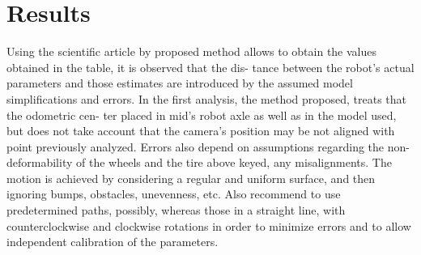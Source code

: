 \section{Results}
Using the scientific article by proposed method allows to obtain the values obtained in the table, it is observed that the dis- tance between the robot’s actual parameters and those estimates are introduced by the assumed model simplifications and errors.
In the first analysis, the method proposed, treats that the odometric cen- ter placed in mid’s robot axle as well as in the model used, but does not take account that the camera’s position may be not aligned with point previously analyzed. 
Errors also depend on assumptions regarding the non-deformability of the wheels and the tire above keyed, any misalignments. The motion is achieved by considering a regular and uniform surface, and then ignoring bumps, obstacles, unevenness, etc. 
Also recommend to use predetermined paths, possibly, whereas those in a straight line, with counterclockwise and clockwise rotations in order to minimize errors and to allow independent calibration of the parameters.